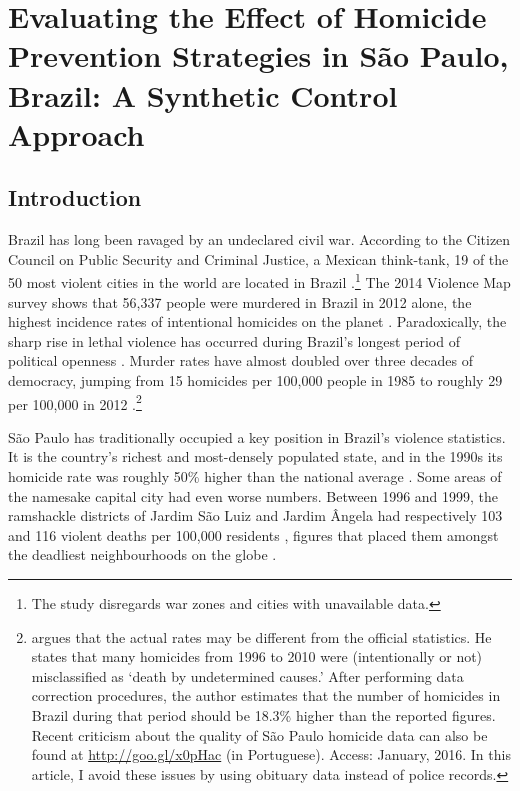 \chapter{Evaluating the Effect of Homicide Prevention Strategies in São Paulo, Brazil: A Synthetic Control Approach}
\label{chap:synth}

\section{Introduction}

Brazil has long been ravaged by an undeclared civil war. According to the Citizen Council on Public Security and Criminal Justice, a Mexican think-tank, 19 of the 50 most violent cities in the world are located in Brazil \citep{mexico2014}.\footnote{The study disregards war zones and cities with unavailable data.} The 2014 Violence Map survey shows that 56,337 people were murdered in Brazil in 2012 alone, the highest incidence rates of intentional homicides on the planet \citep{mapa2014, unodc2013}. Paradoxically, the sharp rise in lethal violence has occurred during Brazil's longest period of political openness \citep{ahnen2003, pinheiro2000, pinheiro2001}. Murder rates have almost doubled over three decades of democracy, jumping from 15 homicides per 100,000 people in 1985 to roughly 29 per 100,000 in 2012 \citep{mapa2014}.\footnote{\citet{cerqueira2013} argues that the actual rates may be different from the official statistics. He states that many homicides from 1996 to 2010 were (intentionally or not) misclassified as `death by undetermined causes.' After performing data correction procedures, the author estimates that the number of homicides in Brazil during that period should be 18.3\% higher than the reported figures. Recent criticism about the quality of São Paulo homicide data can also be found at \url{http://goo.gl/x0pHac} (in Portuguese). Access: January, 2016. In this article, I avoid these issues by using obituary data instead of police records.}

São Paulo has traditionally occupied a key position in Brazil's violence statistics. It is the country's richest and most-densely populated state, and in the 1990s its homicide rate was roughly 50\% higher than the national average \citep[120]{barata2000}. Some areas of the namesake capital city had even worse numbers. Between 1996 and 1999, the ramshackle districts of Jardim São Luiz and Jardim Ângela had respectively 103 and 116 violent deaths per 100,000 residents \citep[8]{cardia2003}, figures that placed them amongst the deadliest neighbourhoods on the globe \citep{who2015}.

